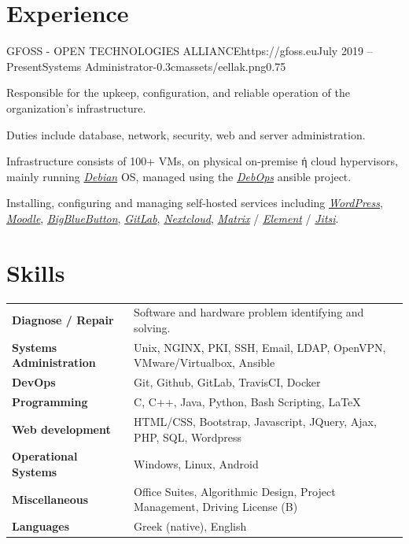 \documentclass{mycv}
\begin{document}
	\section{Experience}

	\begin{EntryDatedLogo}{GFOSS - OPEN TECHNOLOGIES ALLIANCE}{https://gfoss.eu}{July 2019 -- Present}{Systems Administrator}{-0.3cm}{assets/eellak.png}{0.75}
		\begin{Itemize}
			\item Responsible for the upkeep, configuration, and reliable operation of the organization's infrastructure.
			\item Duties include database, network, security, web and server administration.
			\item Infrastructure consists of 100+ VMs, on physical on-premise ή cloud hypervisors, mainly running \href{https://www.debian.org}{\textit{Debian}} OS, managed using the \href{https://debops.org}{\textit{DebOps}} ansible project.
			\item Installing, configuring and managing self-hosted services including \href{https://wordpress.com}{\textit{WordPress}}, \href{https://moodle.org}{\textit{Moodle}}, \href{https://bigbluebutton.org}{\textit{BigBlueButton}}, \href{https://about.gitlab.com/install/}{\textit{GitLab}}, \href{https://nextcloud.com}{\textit{Nextcloud}}, \href{https://matrix.org}{\textit{Matrix}} / \href{https://element.io}{\textit{Element}} / \href{https://jitsi.org}{\textit{Jitsi}}.
		\end{Itemize}
	\end{EntryDatedLogo}

	\section{Skills}
	\begin{tabular}{m{4.5cm} m{12.5cm}}
		\textbf{Diagnose / Repair}     	& Software and hardware problem identifying and solving. \\
		\textbf{Systems Administration}	& Unix, NGINX, PKI, SSH, Email, LDAP, OpenVPN, VMware/Virtualbox, Ansible \\
		\textbf{DevOps}	                & Git, Github, GitLab, TravisCI, Docker \\
		\textbf{Programming} 	 	   	& C, C++, Java, Python, Bash Scripting, \LaTeX \\
		\textbf{Web development}	   	& HTML/CSS, Bootstrap, Javascript, JQuery, Ajax, PHP, SQL, Wordpress \\
		\textbf{Operational Systems}   	& Windows, Linux, Android \\
		\textbf{Miscellaneous}         	& Office Suites, Algorithmic Design, Project Management, Driving License (B) \\
		\textbf{Languages} 			   	& Greek (native), English 
	\end{tabular}
\end{document}
